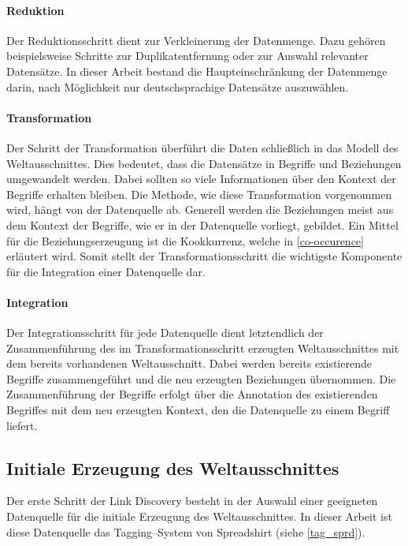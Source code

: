 \paragraph{Reduktion}

Der Reduktionsschritt dient zur Verkleinerung der Datenmenge. Dazu gehören beispielsweise Schritte zur Duplikatentfernung oder zur Auswahl relevanter Datensätze. In dieser Arbeit bestand die Haupteinschränkung der Datenmenge darin, nach Möglichkeit nur deutschsprachige Datensätze auszuwählen.

\paragraph{Transformation}
\label{transformation}

Der Schritt der Transformation überführt die Daten schließlich in das Modell des Weltausschnittes. Dies bedeutet, dass die Datensätze in Begriffe und Beziehungen umgewandelt werden. Dabei sollten so viele Informationen über den Kontext der Begriffe erhalten bleiben. Die Methode, wie diese Transformation vorgenommen wird, hängt von der Datenquelle ab. Generell werden die Beziehungen meist aus dem Kontext der Begriffe, wie er in der Datenquelle vorliegt, gebildet. Ein Mittel für die Beziehungserzeugung ist die Kookkurrenz, welche in \cref{co-occurence} erläutert wird. Somit stellt der Transformationsschritt die wichtigste Komponente für die Integration einer Datenquelle dar.

\paragraph{Integration}

Der Integrationsschritt für jede Datenquelle dient letztendlich der Zusammenführung des im Transformationsschritt erzeugten Weltausschnittes mit dem bereits vorhandenen Weltausschnitt. Dabei werden bereits existierende Begriffe zusammengeführt und die neu erzeugten Beziehungen übernommen. Die Zusammenführung der Begriffe erfolgt über die Annotation des existierenden Begriffes mit dem neu erzeugten Kontext, den die Datenquelle zu einem Begriff liefert.

\subsection{Initiale Erzeugung des Weltausschnittes}

Der erste Schritt der Link Discovery besteht in der Auswahl einer geeigneten Datenquelle für die initiale Erzeugung des Weltausschnittes. In dieser Arbeit ist diese Datenquelle das Tagging--System von Spreadshirt (siehe \cref{tag_sprd}).


